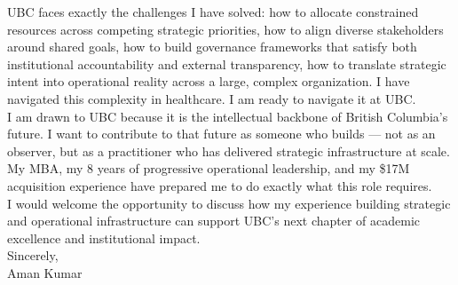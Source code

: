 \documentclass[11pt]{article}
\begin{document}
UBC faces exactly the challenges I have solved: how to allocate constrained resources across competing strategic priorities, how to align diverse stakeholders around shared goals, how to build governance frameworks that satisfy both institutional accountability and external transparency, how to translate strategic intent into operational reality across a large, complex organization. I have navigated this complexity in healthcare. I am ready to navigate it at UBC. \\[8pt]

I am drawn to UBC because it is the intellectual backbone of British Columbia's future. I want to contribute to that future as someone who builds --- not as an observer, but as a practitioner who has delivered strategic infrastructure at scale. My MBA, my 8 years of progressive operational leadership, and my \$17M acquisition experience have prepared me to do exactly what this role requires. \\[8pt]

I would welcome the opportunity to discuss how my experience building strategic and operational infrastructure can support UBC's next chapter of academic excellence and institutional impact. \\[12pt]

Sincerely, \\[8pt]

Aman Kumar
\end{document}
